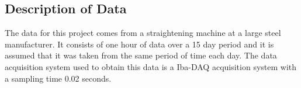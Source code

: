 \documentclass{article}
\begin{document}
\subsection{Description of Data}
The data for this project comes from a straightening machine at a large steel manufacturer. It consists of one hour of data over a 15 day period and it is assumed that it was taken from the same period of time each day. The data acquisition system used to obtain this data is a Iba-DAQ acquisition system with a sampling time 0.02 seconds. 
\end{document}
